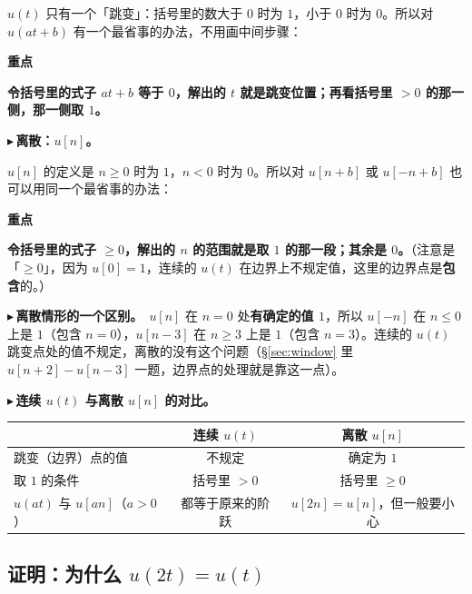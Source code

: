 \documentclass[UTF8,a4paper,11pt]{ctexart}
\newenvironment{remember}{\begin{rememberbox}\textbf{重点}\par\smallskip}{\end{rememberbox}}
\newcounter{ex}[section]
\newcommand{\point}[1]{\par\addvspace{1ex}\noindent\textcolor{ptteal}{$\blacktriangleright$\,\textbf{#1}}\ }
\renewcommand{\paragraph}[1]{\point{#1}}
\begin{document}
$u(t)$ 只有一个「跳变」：括号里的数大于 $0$ 时为 $1$，小于 $0$ 时为 $0$。所以对 $u(at+b)$ 有一个最省事的办法，不用画中间步骤：
\begin{remember}
\textbf{令括号里的式子 $at+b$ 等于 $0$，解出的 $t$ 就是跳变位置；再看括号里 $>0$ 的那一侧，那一侧取 $1$。}
\end{remember}

\paragraph{离散：$u[n]$。}

$u[n]$ 的定义是 $n\ge0$ 时为 $1$，$n<0$ 时为 $0$。所以对 $u[n+b]$ 或 $u[-n+b]$ 也可以用同一个最省事的办法：
\begin{remember}
\textbf{令括号里的式子 $\ge0$，解出的 $n$ 的范围就是取 $1$ 的那一段；其余是 $0$。}（注意是「$\ge0$」，因为 $u[0]=1$，连续的 $u(t)$ 在边界上不规定值，这里的边界点是\textbf{包含}的。）
\end{remember}

\paragraph{离散情形的一个区别。}$u[n]$ 在 $n=0$ 处\textbf{有确定的值 $1$}，所以 $u[-n]$ 在 $n\le0$ 上是 $1$（包含 $n=0$），$u[n-3]$ 在 $n\ge3$ 上是 $1$（包含 $n=3$）。连续的 $u(t)$ 跳变点处的值不规定，离散的没有这个问题（\S\ref{sec:window} 里 $u[n+2]-u[n-3]$ 一题，边界点的处理就是靠这一点）。

\paragraph{连续 $u(t)$ 与离散 $u[n]$ 的对比。}
\begin{center}
\begin{tabular}{@{}lcc@{}}
\toprule
 & 连续 $u(t)$ & 离散 $u[n]$ \\
\midrule
跳变（边界）点的值 & 不规定 & 确定为 $1$\\
取 $1$ 的条件 & 括号里 $>0$ & 括号里 $\ge0$\\
$u(at)$ 与 $u[an]$（$a>0$）& 都等于原来的阶跃 & $u[2n]=u[n]$，但一般要小心\\
\bottomrule
\end{tabular}
\end{center}
\subsection{\texorpdfstring{证明：为什么 $u(2t)=u(t)$}{证明：为什么 u(2t)=u(t)}}\label{sec:step-proof}
\end{document}
